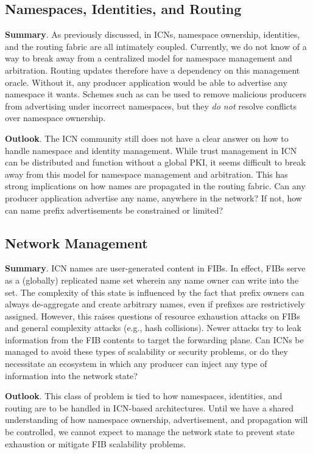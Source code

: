 \subsection{Namespaces, Identities, and Routing}
{\bf Summary}. As previously discussed, in ICNs, namespace ownership, identities, and
the routing fabric are all intimately coupled. Currently, we do not know of a way
to break away from a centralized model for namespace management and arbitration.
Routing updates therefore have a dependency on this management oracle. Without it,
any producer application would be able to advertise any namespace it wants. Schemes
such as \cite{dibenedetto2015mitigating} can be used to remove malicious producers
from advertising under incorrect namespaces, but they \emph{do not} resolve conflicts
over namespace ownership.

{\bf Outlook}. The ICN community still does not have a clear answer on how to handle
namespace and identity management. While trust management in ICN can be distributed and
function without a global PKI, it seems difficult to break away from this model for
namespace management and arbitration. This has strong implications on how names are
propagated in the routing fabric. Can any producer application advertise any name,
anywhere in the network? If not, how can name prefix advertisements be constrained or limited?

\subsection{Network Management}
{\bf Summary}. ICN names are user-generated content in FIBs. In effect, FIBs serve as a (globally)
replicated name set wherein any name owner can write into the set. The complexity of
this state is influenced by the fact that prefix owners can always de-aggregate and
create arbitrary names, even if prefixes are restrictively assigned. However, this
raises questions of resource exhaustion attacks on FIBs and general complexity
attacks (e.g., hash collisions). Newer attacks try to leak information from the
FIB contents to target the forwarding plane. Can ICNs be managed to avoid these
types of scalability or security problems, or do they necessitate an ecosystem in
which any producer can inject any type of information into the network state?

{\bf Outlook}. This class of problem is tied to how namespaces, identities, and routing
are to be handled in ICN-based architectures. Until we have a shared understanding
of how namespace ownership, advertisement, and propagation will be controlled, we
cannot expect to manage the network state to prevent state exhaustion or mitigate
FIB scalability problems.

